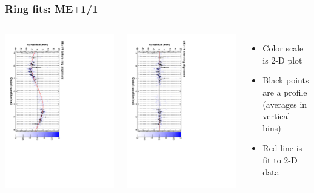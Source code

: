 \documentclass[compress]{beamer}
\begin{document}
\begin{frame}
\frametitle{Ring fits: ME$+$1/1}
\vfill
\begin{columns}
\includegraphics[height=\linewidth, angle=90]{ringfits_before/mep11.pdf}

\includegraphics[height=\linewidth, angle=90]{ringfits_after/mep11.pdf}
\begin{itemize}
\item Color scale is 2-D plot
\item Black points are a profile (averages in vertical bins)
\item Red line is fit to 2-D data
\end{itemize}
\end{columns}
\end{frame}
\end{document}
